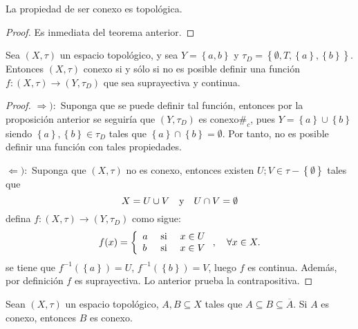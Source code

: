 \documentclass[12pt]{report}
\theoremstyle{largebreak}
\newcommand\cf[3]{\ensuremath{#1:#2\rightarrow#3}}
\newcommand\contradiction{\ensuremath{\#_c}}
\newcommand{\Cls}[1]{\ensuremath{\overline{#1}}}
\begin{document}
    \begin{cor}
        La propiedad de ser conexo es topológica.
    \end{cor}

    \begin{proof}
        Es inmediata del teorema anterior.
    \end{proof}

    \begin{propo}
        Sea $(X,\tau)$ un espacio topológico, y sea $Y=\left\{a,b\right\}$ y $\tau_D=\left\{\emptyset,T,\left\{a\right\},\left\{b\right\} \right\}$. Entonces $(X,\tau)$ conexo si y sólo si no es posible definir una función $\cf{f}{(X,\tau)}{(Y,\tau_D)}$ que sea suprayectiva y continua.
    \end{propo}

    \begin{proof}
        $\Rightarrow):$ Suponga que se puede definir tal función, entonces por la proposición anterior se seguiría que $(Y,\tau_D)$ es conexo\contradiction, pues $Y=\left\{a\right\}\cup\left\{b\right\}$ siendo $\left\{a\right\},\left\{b\right\}\in\tau_D$ tales que $\left\{a\right\}\cap\left\{b\right\}=\emptyset$. Por tanto, no es posible definir una función con tales propiedades.

        $\Leftarrow):$ Suponga que $(X,\tau)$ no es conexo, entonces existen $U;V\in\tau-\left\{\emptyset\right\}$ tales que
        \begin{equation*}
            X=U\cup V\quad\textup{y}\quad U\cap V=\emptyset
        \end{equation*}
        defina $\cf{f}{(X,\tau)}{(Y,\tau_D)}$ como sigue:
        \begin{equation*}
            f(x)=\left\{
                \begin{array}{lcr}
                    a & \textup{ si } & x\in U\\
                    b & \textup{ si } & x\in V\\
                \end{array}
            \right.,\quad\forall x\in X.
        \end{equation*}
        se tiene que $f^{-1}(\left\{a\right\})=U$, $f^{-1}(\left\{b\right\})=V$, luego $f$ es continua. Además, por definición $f$ es suprayectiva. Lo anterior prueba la contrapositiva.
    \end{proof}

    \begin{propo}
        Sean $(X,\tau)$ un espacio topológico, $A,B\subseteq X$ tales que $A\subseteq B\subseteq \Cls{A}$. Si $A$ es conexo, entonces $B$ es conexo.
    \end{propo}
\end{document}
